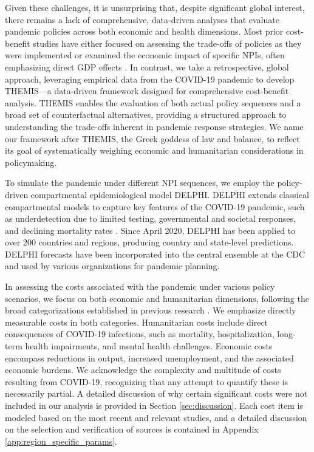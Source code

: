 \documentclass[msom,blindrev]{informs3} %
\begin{document}
Given these challenges, it is unsurprising that, despite significant global interest, there remains a lack of comprehensive, data-driven analyses that evaluate pandemic policies across both economic and health dimensions. Most prior cost-benefit studies have either focused on assessing the trade-offs of policies as they were implemented  or examined the economic impact of specific NPIs, often emphasizing direct GDP effects . In contrast, we take a retrospective, global approach, leveraging empirical data from the COVID-19 pandemic to develop THEMIS—a data-driven framework designed for comprehensive cost-benefit analysis. THEMIS enables the evaluation of both actual policy sequences and a broad set of counterfactual alternatives, providing a structured approach to understanding the trade-offs inherent in pandemic response strategies. We name our framework after THEMIS, the Greek goddess of law and balance, to reflect its goal of systematically weighing economic and humanitarian considerations in policymaking.

To simulate the pandemic under different NPI sequences, we employ the policy-driven compartmental epidemiological model DELPHI. DELPHI extends classical compartmental models to capture key features of the COVID-19 pandemic, such as underdetection due to limited testing, governmental and societal responses, and declining mortality rates . Since April 2020, DELPHI has been applied to over 200 countries and regions, producing country and state-level predictions. DELPHI forecasts have been incorporated into the central ensemble at the CDC and used by various organizations for pandemic planning.

In assessing the costs associated with the pandemic under various policy scenarios, we focus on both economic and humanitarian dimensions, following the broad categorizations established in previous research . We emphasize directly measurable costs in both categories. Humanitarian costs include direct consequences of COVID-19 infections, such as mortality, hospitalization, long-term health impairments, and mental health challenges. Economic costs encompass reductions in output, increased unemployment, and the associated economic burdens. We acknowledge the complexity and multitude of costs resulting from COVID-19, recognizing that any attempt to quantify these is necessarily partial. A detailed discussion of why certain significant costs were not included in our analysis is provided in Section \ref{sec:discussion}. Each cost item is modeled based on the most recent and relevant studies, and a detailed discussion on the selection and verification of sources is contained in Appendix \ref{app:region_specific_params}.
\end{document}
